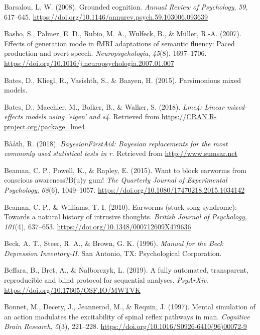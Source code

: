 \documentclass[a4paper,12pt,twoside,openright,oldfontcommands,final]{memoir}
\begin{document}
\leavevmode\hypertarget{ref-Barsalou2008}{}%
Barsalou, L. W. (2008). Grounded cognition. \emph{Annual Review of Psychology}, \emph{59}, 617--645. \url{https://doi.org/10.1146/annurev.psych.59.103006.093639}

\leavevmode\hypertarget{ref-basho_effects_2007}{}%
Basho, S., Palmer, E. D., Rubio, M. A., Wulfeck, B., \& Müller, R.-A. (2007). Effects of generation mode in fMRI adaptations of semantic fluency: Paced production and overt speech. \emph{Neuropsychologia}, \emph{45}(8), 1697--1706. \url{https://doi.org/10.1016/j.neuropsychologia.2007.01.007}

\leavevmode\hypertarget{ref-bates_parsimonious_2015}{}%
Bates, D., Kliegl, R., Vasishth, S., \& Baayen, H. (2015). Parsimonious mixed models.

\leavevmode\hypertarget{ref-R-lme4}{}%
Bates, D., Maechler, M., Bolker, B., \& Walker, S. (2018). \emph{Lme4: Linear mixed-effects models using 'eigen' and s4}. Retrieved from \url{https://CRAN.R-project.org/package=lme4}

\leavevmode\hypertarget{ref-R-BayesianFirstAid}{}%
Bååth, R. (2018). \emph{BayesianFirstAid: Bayesian replacements for the most commonly used statistical tests in r.} Retrieved from \url{http://www.sumsar.net}

\leavevmode\hypertarget{ref-Beaman2015}{}%
Beaman, C. P., Powell, K., \& Rapley, E. (2015). Want to block earworms from conscious awareness?B(u)y gum! \emph{The Quarterly Journal of Experimental Psychology}, \emph{68}(6), 1049--1057. \url{https://doi.org/10.1080/17470218.2015.1034142}

\leavevmode\hypertarget{ref-Beaman2010}{}%
Beaman, C. P., \& Williams, T. I. (2010). Earworms (stuck song syndrome): Towards a natural history of intrusive thoughts. \emph{British Journal of Psychology}, \emph{101}(4), 637--653. \url{https://doi.org/10.1348/000712609X479636}

\leavevmode\hypertarget{ref-beck_manual_1996}{}%
Beck, A. T., Steer, R. A., \& Brown, G. K. (1996). \emph{Manual for the Beck Depression Inventory-II}. San Antonio, TX: Psychological Corporation.

\leavevmode\hypertarget{ref-beffara_fully_2019}{}%
Beffara, B., Bret, A., \& Nalborczyk, L. (2019). A fully automated, transparent, reproducible and blind protocol for sequential analyses. \emph{PsyArXiv}. \url{https://doi.org/10.17605/OSF.IO/MWTVK}

\leavevmode\hypertarget{ref-bonnet_mental_1997}{}%
Bonnet, M., Decety, J., Jeannerod, M., \& Requin, J. (1997). Mental simulation of an action modulates the excitability of spinal reflex pathways in man. \emph{Cognitive Brain Research}, \emph{5}(3), 221--228. \url{https://doi.org/10.1016/S0926-6410(96)00072-9}
\end{document}
